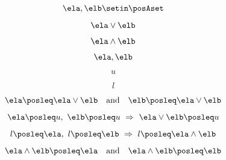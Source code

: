 {\begin{forslides}
        \begin{equation}
            \label{eq:slides_adjunctions_30}
            \ela, \elb \setin \posAset
        \end{equation}

        \begin{equation}
            \label{eq:slides_adjunctions_31}
            \ela \vee \elb
        \end{equation}

        \begin{equation}
            \label{eq:slides_adjunctions_32}
            \ela \wedge \elb
        \end{equation}

        \begin{equation}
            \label{eq:slides_adjunctions_33}
            \ela, \elb
        \end{equation}

        \begin{equation}
            \label{eq:slides_adjunctions_34}
            u
        \end{equation}

        \begin{equation}
            \label{eq:slides_adjunctions_35}
            l
        \end{equation}

        \begin{equation}
            \label{eq:slides_adjunctions_36}
            \ela \posleq \ela \vee \elb \quad \text{and} \quad \elb \posleq \ela \vee \elb
        \end{equation}

        \begin{equation}
            \label{eq:slides_adjunctions_37}
            \ela \posleq u, \ \elb \posleq u \ \Rightarrow \ \ela \vee \elb \posleq u
        \end{equation}

        \begin{equation}
            \label{eq:slides_adjunctions_38}
            l \posleq \ela, \ l \posleq \elb  \ \Rightarrow \  l \posleq \ela \wedge \elb
        \end{equation}

        \begin{equation}
            \label{eq:slides_adjunctions_39}
            \ela \wedge \elb \posleq \ela \quad \text{and} \quad \ela \wedge \elb \posleq \elb
        \end{equation}


\end{forslides}}
